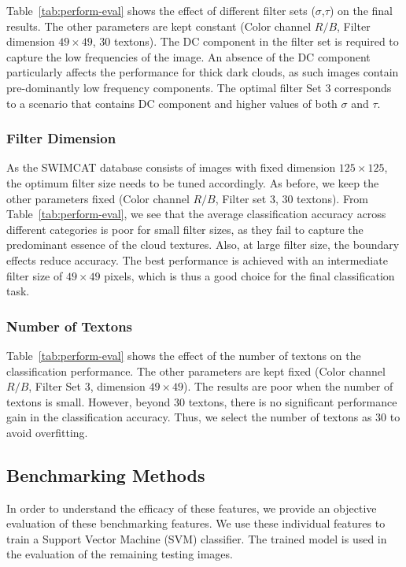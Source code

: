 Table~\ref{tab:perform-eval} shows the effect of different filter sets ($\sigma$,$\tau$) on the final results. The other parameters are kept constant (Color channel $R/B$, Filter dimension $49 \times 49$, $30$  textons). The DC component in the filter set is required to capture the low frequencies of the image. An absence of the DC component particularly affects the performance for thick dark clouds, as such images contain pre-dominantly low frequency components. The optimal filter Set $3$ corresponds to a scenario that contains DC component and higher values of both $\sigma$ and $\tau$. 


\subsubsection{Filter Dimension}
As the SWIMCAT database consists of images with fixed dimension $125 \times 125$, the optimum filter size needs to be tuned accordingly. As before, we keep the other parameters fixed (Color channel  $R/B$, Filter set $3$, $30$ textons). From Table~\ref{tab:perform-eval}, we see that the average classification accuracy across different categories is poor for small filter sizes, as they fail to capture the predominant essence of the cloud textures. Also, at large filter size, the boundary effects reduce accuracy. The best performance is achieved with an intermediate filter size of $49 \times 49$ pixels, which is thus a good choice for the final classification task. 


\subsubsection{Number of Textons}
Table~\ref{tab:perform-eval} shows the effect of the number of textons on the classification performance. The other parameters are kept fixed (Color channel $R/B$, Filter Set $3$, dimension $49 \times 49$). The results are poor when the number of textons is small. However, beyond 30 textons, there is no significant performance gain in the classification accuracy. Thus, we select the number of textons as $30$ to avoid overfitting. 


\subsection{Benchmarking Methods}
In order to understand the efficacy of these features, we provide an objective evaluation of these benchmarking features. We use these individual features to train a Support Vector Machine (SVM) classifier. The trained model is used in the evaluation of the remaining testing images. 

